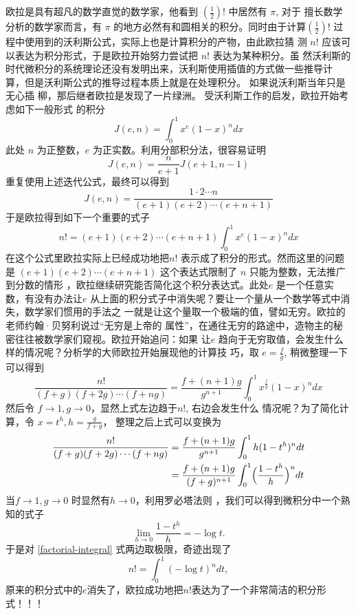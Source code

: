 欧拉是具有超凡的数学直觉的数学家，他看到 $ (\frac{1}{2})!$ 中居然有 $\pi$, 对于
擅长数学分析的数学家而言，有 $\pi$ 的地方必然有和圆相关的积分。同时由于计算$
(\frac{1}{2})!$ 过程中使用到的沃利斯公式，实际上也是计算积分的产物，由此欧拉猜
测 $n!$ 应该可以表达为积分形式，于是欧拉开始努力尝试把 $n!$ 表达为某种积分。虽
然沃利斯的时代微积分的系统理论还没有发明出来，沃利斯使用插值的方式做一些推导计
算，但是沃利斯公式的推导过程本质上就是在处理积分。 如果说沃利斯当年只是无心插
柳，那后继者欧拉是发现了一片绿洲。 受沃利斯工作的启发，欧拉开始考虑如下一般形式
的积分
$$ J(e,n) = \int_0^1 x^e(1-x)^ndx$$
此处 $n$ 为正整数，$e$ 为正实数。利用分部积分法，很容易证明
$$ J(e,n) = \frac{n}{e+1}J(e+1,n-1) $$
重复使用上述迭代公式，最终可以得到
$$ J(e,n) = \frac{1\cdot2\cdots n}{(e+1)(e+2)\cdots(e+n+1)} $$
于是欧拉得到如下一个重要的式子
\begin{equation}
n! = (e+1)(e+2)\cdots(e+n+1)\int_0^1 x^e(1-x)^ndx
\end{equation}
在这个公式里欧拉实际上已经成功地把$n!$ 表示成了积分的形式。然而这里的问题是
$(e+1)(e+2)\cdots(e+n+1)$ 这个表达式限制了 $n$ 只能为整数，无法推广到分数的情形
，欧拉继续研究能否简化这个积分表达式。此处$e$ 是一个任意实数，有没有办法让$e$
从上面的积分式子中消失呢？要让一个量从一个数学等式中消失，数学家们惯用的手法之
一就是让这个量取一个极端的值，譬如无穷。欧拉的老师约翰·贝努利说过“无穷是上帝的
属性”，在通往无穷的路途中，造物主的秘密往往被数学家们窥视。欧拉开始追问：如果
让$e$ 趋向于无穷取值，会发生什么样的情况呢？分析学的大师欧拉开始展现他的计算技
巧，取
$e=\frac{f}{g}$, 稍微整理一下可以得到
$$ \frac{n!}{(f+g)(f+2g)\cdots(f+ng)} = \frac{f+(n+1)g}{g^{n+1}} \int_0^1 x^\frac{f}{g}(1-x)^n dx $$
然后令 $f \rightarrow 1, g \rightarrow 0$，显然上式左边趋于$n!$, 右边会发生什么
情况呢？为了简化计算，令 $x=t^h, h=\frac{g}{f+g}$， 整理之后上式可以变换为
\begin{align}
\frac{n!}{(f+g)(f+2g)\cdots(f+ng)}
& = \frac{f+(n+1)g}{g^{n+1}} \int_0^1 h(1-t^h)^n dt  \notag \\
& = \frac{f+(n+1)g}{(f+g)^{n+1}} \int_0^1 \Bigl(\frac{1-t^h}{h}\Bigr)^n dt 
\label{factorial-integral}
\end{align}
当$f \rightarrow 1, g \rightarrow 0$ 时显然有$h \rightarrow 0$，利用罗必塔法则
，我们可以得到微积分中一个熟知的式子
$$ \lim_{h \rightarrow 0} \frac{1-t^h}{h} = -\log t .$$
于是对 \eqref{factorial-integral} 式两边取极限，奇迹出现了
\begin{equation}
\label{factorial-gamma-1}
n! = \int_0^1 (-\log t)^ndt, 
\end{equation}
原来的积分式中的$e$消失了，欧拉成功地把$n!$表达为了一个非常简洁的积分形式！！！
